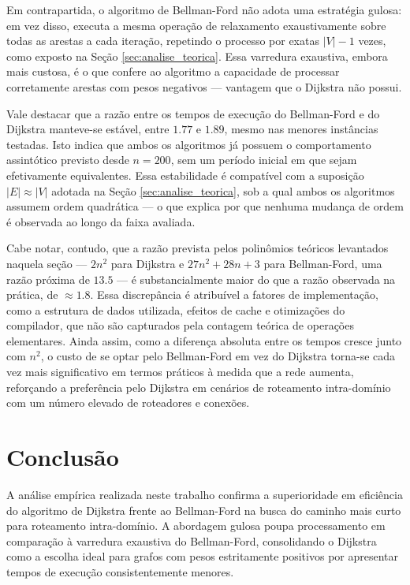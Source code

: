 \documentclass[12pt]{article}
\begin{document}
Em contrapartida, o algoritmo de Bellman-Ford não adota uma
estratégia gulosa: em vez disso, executa a mesma operação de
relaxamento exaustivamente sobre todas as arestas a cada iteração,
repetindo o processo por exatas $|V| - 1$ vezes, como exposto na
Seção \ref{sec:analise_teorica}. Essa varredura exaustiva, embora
mais custosa, é o que confere ao algoritmo a capacidade de processar
corretamente arestas com pesos negativos --- vantagem que o Dijkstra não possui.

Vale destacar que a razão entre os tempos de execução do Bellman-Ford
e do Dijkstra manteve-se estável, entre $1.77$ e $1.89$, mesmo nas
menores instâncias testadas. Isto indica que ambos os algoritmos já
possuem o comportamento assintótico previsto desde $n = 200$, sem um
período inicial em que sejam efetivamente equivalentes. Essa
estabilidade é compatível com a suposição $|E| \approx |V|$ adotada
na Seção \ref{sec:analise_teorica}, sob a qual ambos os algoritmos
assumem ordem quadrática --- o que explica por que nenhuma mudança de
ordem é observada ao longo da faixa avaliada.

Cabe notar, contudo, que a razão prevista pelos polinômios teóricos
levantados naquela seção — $2n^2$ para Dijkstra e $27n^2 + 28n + 3$
para Bellman-Ford, uma razão próxima de $13.5$ — é substancialmente
maior do que a razão observada na prática, de $\approx 1.8$. Essa
discrepância é atribuível a fatores de implementação, como a estrutura de
dados utilizada, efeitos de cache e otimizações do compilador, que não
são capturados pela contagem teórica de operações elementares. Ainda
assim, como a diferença absoluta entre os tempos cresce junto com
$n^2$, o custo de se optar pelo Bellman-Ford em vez do Dijkstra
torna-se cada vez mais significativo em termos práticos à medida que
a rede aumenta, reforçando a preferência pelo Dijkstra em cenários de
roteamento intra-domínio com um número elevado de roteadores e conexões.

\section{Conclusão}

A análise empírica realizada neste trabalho confirma a superioridade
em eficiência do algoritmo de Dijkstra frente ao Bellman-Ford na
busca do caminho mais curto para roteamento intra-domínio. A
abordagem gulosa poupa processamento em comparação à varredura
exaustiva do Bellman-Ford, consolidando o Dijkstra como a escolha
ideal para grafos com pesos estritamente positivos por apresentar
tempos de execução consistentemente menores.
\end{document}
